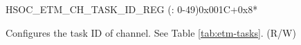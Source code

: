 \begin{register}{H}{SOC\_ETM\_CH\_TASK\_ID\_REG (: 0-49)}{0x001C+0x8*}\label{regdesc:SOCETMCH0TASKIDREG}
%
%
\regnewline%
\begin{regdesc}\begin{reglist}
\label{fielddesc:SOCETMCH0TASKID}\item [SOC\_ETM\_CH\regindex{n}\_TASK\_ID (\regindex{n}: 0-49)] Configures the task ID of channel. See Table \ref{tab:etm-tasks}. (R/W)
\end{reglist}\end{regdesc}
\end{register}


